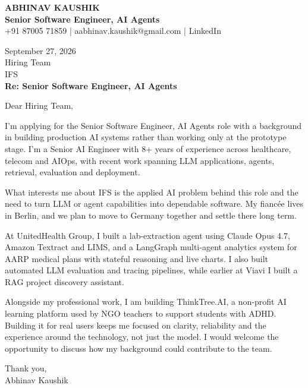 \documentclass[10pt,a4paper]{article}
\begin{document}
\begin{center}
{\Large\bfseries ABHINAV KAUSHIK}\\[2pt]
{\bfseries Senior Software Engineer, AI Agents}\\[2pt]
+91 87005 71859 \quad | \quad aabhinav.kaushik@gmail.com \quad | \quad LinkedIn
\end{center}
\vspace{8pt}
September 27, 2026\\[6pt]
Hiring Team\\
IFS\\[4pt]
\textbf{Re: Senior Software Engineer, AI Agents}

Dear Hiring Team,

I’m applying for the Senior Software Engineer, AI Agents role with a background in building production AI systems rather than working only at the prototype stage. I’m a Senior AI Engineer with 8+ years of experience across healthcare, telecom and AIOps, with recent work spanning LLM applications, agents, retrieval, evaluation and deployment.

What interests me about IFS is the applied AI problem behind this role and the need to turn LLM or agent capabilities into dependable software. My fiancée lives in Berlin, and we plan to move to Germany together and settle there long term.

At UnitedHealth Group, I built a lab-extraction agent using Claude Opus 4.7, Amazon Textract and LIMS, and a LangGraph multi-agent analytics system for AARP medical plans with stateful reasoning and live charts. I also built automated LLM evaluation and tracing pipelines, while earlier at Viavi I built a RAG project discovery assistant.

Alongside my professional work, I am building ThinkTree.AI, a non-profit AI learning platform used by NGO teachers to support students with ADHD. Building it for real users keeps me focused on clarity, reliability and the experience around the technology, not just the model. I would welcome the opportunity to discuss how my background could contribute to the team.

Thank you,\\
Abhinav Kaushik
\end{document}
